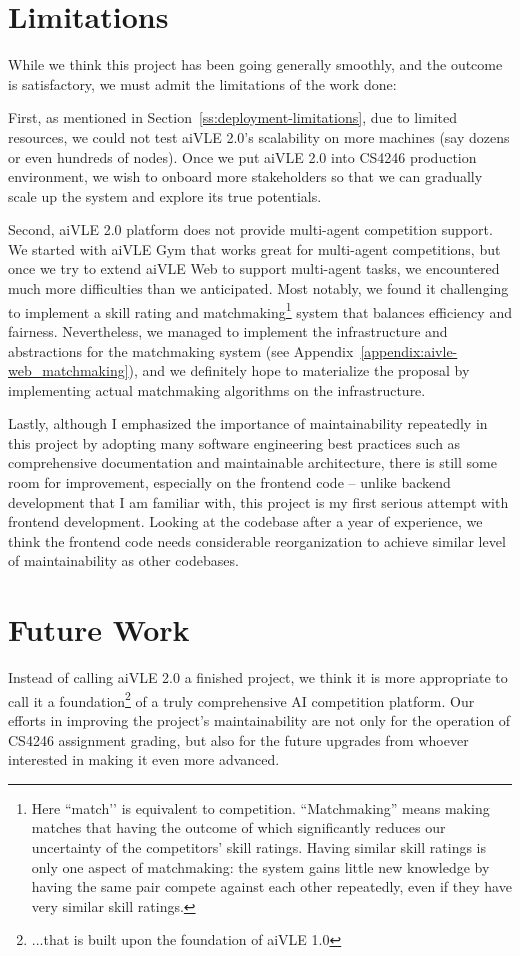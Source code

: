 \section{Limitations}
\label{s:conclusion-limitations}
While we think this project has been going generally smoothly, and the outcome is satisfactory, we must admit the limitations of the work done:

First, as mentioned in Section~\ref{ss:deployment-limitations}, due to limited resources, we could not test aiVLE 2.0's scalability on more machines (say dozens or even hundreds of nodes). Once we put aiVLE 2.0 into CS4246 production environment, we wish to onboard more stakeholders so that we can gradually scale up the system and explore its true potentials.

Second, aiVLE 2.0 platform does not provide multi-agent competition support. We started with aiVLE Gym that works great for multi-agent competitions, but once we try to extend aiVLE Web to support multi-agent tasks, we encountered much more difficulties than we anticipated. Most notably, we found it challenging to implement a skill rating and matchmaking\footnote{Here ``match’’ is equivalent to competition. ``Matchmaking'' means making matches that having the outcome of which significantly reduces our uncertainty of the competitors' skill ratings. Having similar skill ratings is only one aspect of matchmaking: the system gains little new knowledge by having the same pair compete against each other repeatedly, even if they have very similar skill ratings.} system that balances efficiency and fairness. Nevertheless, we managed to implement the infrastructure and abstractions for the matchmaking system (see Appendix~\ref{appendix:aivle-web_matchmaking}), and we definitely hope to materialize the proposal by implementing actual matchmaking algorithms on the infrastructure.

Lastly, although I emphasized the importance of maintainability repeatedly in this project by adopting many software engineering best practices such as comprehensive documentation and maintainable architecture, there is still some room for improvement, especially on the frontend code – unlike backend development that I am familiar with, this project is my first serious attempt with frontend development. Looking at the codebase after a year of experience, we think the frontend code needs considerable reorganization to achieve similar level of maintainability as other codebases.

\section{Future Work}
\label{s:conclusion-future_work}
Instead of calling aiVLE 2.0 a finished project, we think it is more appropriate to call it a foundation\footnote{...that is built upon the foundation of aiVLE 1.0} of a truly comprehensive AI competition platform. Our efforts in improving the project's maintainability are not only for the operation of CS4246 assignment grading, but also for the future upgrades from whoever interested in making it even more advanced.

